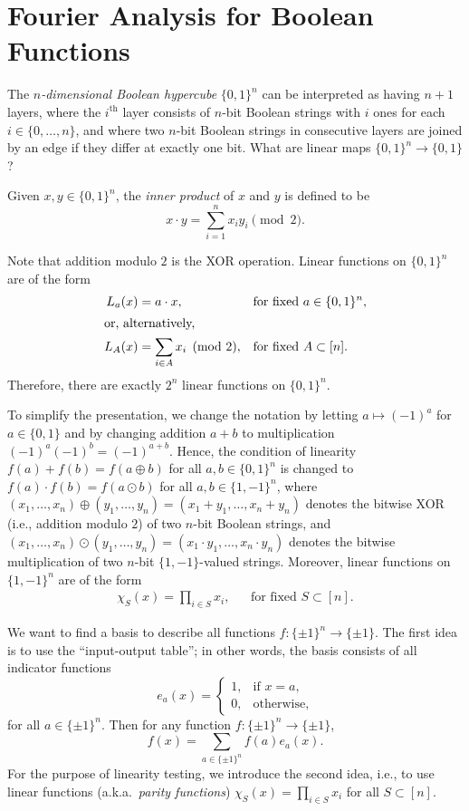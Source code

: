 \documentclass[letterpaper, reqno,11pt]{article}
\begin{document}
\section{Fourier Analysis for Boolean Functions} \label{sec:fourier}

The \emph{$n$-dimensional Boolean hypercube} $\{ 0, 1 \}^n$ can be interpreted as having $n + 1$ layers, where the $i^\text{th}$ layer consists of $n$-bit Boolean strings with $i$ ones for each $i \in \{ 0, \ldots, n \}$, and where two $n$-bit Boolean strings in consecutive layers are joined by an edge if they differ at exactly one bit. What are linear maps $\{ 0, 1 \}^n \to \{ 0, 1 \}$?

\begin{definition}
  Given $x, y \in \{ 0, 1 \}^n$, the \emph{inner product} of $x$ and $y$ is defined to be
  $$ x \cdot y = \sum_{i = 1}^n x_i y_i \pmod{2}. $$
\end{definition}

Note that addition modulo $2$ is the XOR operation. Linear functions on $\{ 0, 1 \}^n$ are of the form
\begin{align*}
  L_a(x) &= a \cdot x, && \text{for fixed $a \in \{ 0, 1 \}^n$}, \\
  \intertext{or, alternatively,}
  L_A(x) &= \sum_{i \in A} x_i \pmod{2}, && \text{for fixed $A \subset [n]$}.
\end{align*}
Therefore, there are exactly $2^n$ linear functions on $\{ 0, 1 \}^n$.

To simplify the presentation, we change the notation by letting $a \mapsto (-1)^a$ for $a \in \{ 0, 1 \}$ and by changing addition $a + b$ to multiplication $(-1)^a (-1)^b = (-1)^{a + b}$. Hence, the condition of linearity $f(a) + f(b) = f(a \oplus b)$ for all $a, b \in \{ 0, 1 \}^n$ is changed to $f(a) \cdot f(b) = f(a \odot b)$ for all $a, b \in \{ 1, -1 \}^n$, where $(x_1, \ldots, x_n) \oplus (y_1, \ldots, y_n) = (x_1 + y_1, \ldots, x_n + y_n)$ denotes the bitwise XOR (i.e., addition modulo $2$) of two $n$-bit Boolean strings, and $(x_1, \ldots, x_n) \odot (y_1, \ldots, y_n) = (x_1 \cdot y_1, \ldots, x_n \cdot y_n)$ denotes the bitwise multiplication of two $n$-bit $\{ 1, -1 \}$-valued strings. Moreover, linear functions on $\{ 1, -1 \}^n$ are of the form
\begin{align*}
  \chi_S(x) = \prod_{i \in S} x_i, && \text{for fixed $S \subset [n]$}.
\end{align*}

We want to find a basis to describe all functions $f : \{ \pm 1 \}^n \to \{ \pm 1 \}$. The first idea is to use the ``input-output table''; in other words, the basis consists of all indicator functions
$$ e_a(x) = \left\{
  \begin{array}{ll}
    1, & \text{if $x = a$}, \\
    0, & \text{otherwise},
  \end{array}
\right. $$
for all $a \in \{ \pm 1 \}^n$. Then for any function $f :  \{ \pm 1 \}^n \to \{ \pm 1 \}$,
$$ f(x) = \sum_{a \in \{ \pm 1 \}^n} f(a) e_a(x). $$
For the purpose of linearity testing, we introduce the second idea, i.e., to use linear functions (a.k.a.\ \emph{parity functions}) $\chi_S(x) = \prod_{i \in S} x_i$ for all $S \subset [n]$.
\end{document}
